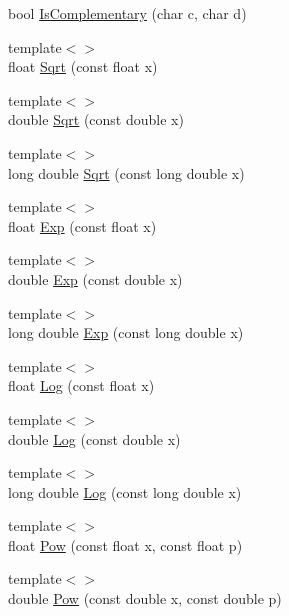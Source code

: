 \begin{DoxyCompactItemize}
bool \hyperlink{namespace_c_o_n_t_r_a_l_i_g_n_adfeb25c8dd97c0d84c2b827e3d92e2e7}{Is\+Complementary} (char c, char d)
\item 
{\footnotesize template$<$$>$ }\\float \hyperlink{namespace_c_o_n_t_r_a_l_i_g_n_a5425dcac6298080e920d815d5181d13c}{Sqrt} (const float x)
\item 
{\footnotesize template$<$$>$ }\\double \hyperlink{namespace_c_o_n_t_r_a_l_i_g_n_aa5b0dc66ae5b9d211a2418219cd1e7a4}{Sqrt} (const double x)
\item 
{\footnotesize template$<$$>$ }\\long double \hyperlink{namespace_c_o_n_t_r_a_l_i_g_n_ab98bf329d8c67035829fa0055a84d591}{Sqrt} (const long double x)
\item 
{\footnotesize template$<$$>$ }\\float \hyperlink{namespace_c_o_n_t_r_a_l_i_g_n_aeaeb9f23b84ef5a3cb1f50056b205607}{Exp} (const float x)
\item 
{\footnotesize template$<$$>$ }\\double \hyperlink{namespace_c_o_n_t_r_a_l_i_g_n_a4f40660e51cb8debd179b0e375b8e9f0}{Exp} (const double x)
\item 
{\footnotesize template$<$$>$ }\\long double \hyperlink{namespace_c_o_n_t_r_a_l_i_g_n_a2f9f92ee735011a2f6864ff388a15ebe}{Exp} (const long double x)
\item 
{\footnotesize template$<$$>$ }\\float \hyperlink{namespace_c_o_n_t_r_a_l_i_g_n_a569ff2ac6f15afca32da99bc7c90a2ec}{Log} (const float x)
\item 
{\footnotesize template$<$$>$ }\\double \hyperlink{namespace_c_o_n_t_r_a_l_i_g_n_a42c87473a0bb7acac9a2ec85b8170c48}{Log} (const double x)
\item 
{\footnotesize template$<$$>$ }\\long double \hyperlink{namespace_c_o_n_t_r_a_l_i_g_n_a203566733c1db741c04c8ba43bfac9f2}{Log} (const long double x)
\item 
{\footnotesize template$<$$>$ }\\float \hyperlink{namespace_c_o_n_t_r_a_l_i_g_n_a84be357ebad35b3bc5c1f868eae5a880}{Pow} (const float x, const float p)
\item 
{\footnotesize template$<$$>$ }\\double \hyperlink{namespace_c_o_n_t_r_a_l_i_g_n_ab3f0a54836ccd297d5bbe337f191943a}{Pow} (const double x, const double p)

\end{DoxyCompactItemize}
